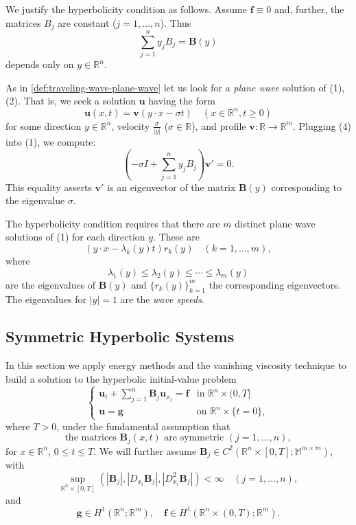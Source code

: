 \begin{remark}
\label{rem:motivation-hyperbolicity-plane-wave}
We justify the hyperbolicity condition as follows. Assume $\mathbf{f} \equiv 0$ and, further, the matrices $B_j$ are constant ($j = 1, \ldots, n$). Thus
\[
\sum_{j=1}^{n} y_j B_j = \mathbf{B}(y)
\tag{3}
\]
depends only on $y \in \mathbb{R}^n$.

As in \cref{def:traveling-wave-plane-wave} let us look for a \textit{plane wave} solution of (1), (2). That is, we seek a solution $\mathbf{u}$ having the form
\[
\mathbf{u}(x, t) = \mathbf{v}(y \cdot x - \sigma t) \quad (x \in \mathbb{R}^n, t \geq 0)
\tag{4}
\]
for some direction $y \in \mathbb{R}^n$, velocity $\frac{\sigma}{|y|}$ ($\sigma \in \mathbb{R}$), and profile $\mathbf{v} : \mathbb{R} \to \mathbb{R}^m$. Plugging (4) into (1), we compute:
\[
\left( -\sigma I + \sum_{j=1}^{n} y_j B_j \right) \mathbf{v}' = 0.
\]
This equality asserts $\mathbf{v}'$ is an eigenvector of the matrix $\mathbf{B}(y)$ corresponding to the eigenvalue $\sigma$.

The hyperbolicity condition requires that there are $m$ distinct plane wave solutions of (1) for each direction $y$. These are
\[
(y \cdot x - \lambda_k(y)t)r_k(y) \quad (k = 1, \ldots, m),
\]
where
\[
\lambda_1(y) \leq \lambda_2(y) \leq \cdots \leq \lambda_m(y)
\]
are the eigenvalues of $\mathbf{B}(y)$ and $\{r_k(y)\}_{k=1}^m$ the corresponding eigenvectors. The eigenvalues for $|y| = 1$ are the \textit{wave speeds}.
\end{remark}

\subsection{Symmetric Hyperbolic Systems}

In this section we apply energy methods and the vanishing viscosity technique to build a solution to the hyperbolic initial-value problem
\[
\begin{cases} \mathbf{u}_t + \sum_{j=1}^n \mathbf{B}_j \mathbf{u}_{x_j} = \mathbf{f} & \text{in } \mathbb{R}^n \times (0,T] \\ \mathbf{u} = \mathbf{g} & \text{on } \mathbb{R}^n \times \{t=0\}, \end{cases}
\tag{5}
\]
where $T > 0$, under the fundamental assumption that
\[
\text{the matrices } \mathbf{B}_j(x,t) \text{ are symmetric } (j = 1,\ldots,n),
\tag{6}
\]
for $x \in \mathbb{R}^n$, $0 \le t \le T$. We will further assume $\mathbf{B}_j \in C^2(\mathbb{R}^n \times [0,T];\mathbb{M}^{m \times m})$, with
\[
\sup_{\mathbb{R}^n \times [0,T]} (|\mathbf{B}_j|, |D_{x_i}\mathbf{B}_j|, |D^2_{x_i}\mathbf{B}_j|) < \infty \quad (j = 1,\ldots,n),
\tag{7}
\]
and
\[
\mathbf{g} \in H^1(\mathbb{R}^n; \mathbb{R}^m), \quad \mathbf{f} \in H^1(\mathbb{R}^n \times (0,T);\mathbb{R}^m).
\tag{8}
\]

